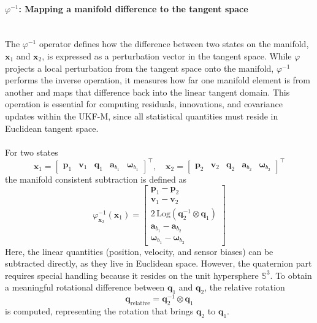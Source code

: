 \paragraph{$\varphi^{-1}$: Mapping a manifold difference to the tangent space} \mbox{}\\[0.5em] \noindent
The $\varphi^{-1}$ operator defines how the difference between two states on the manifold, $\mathbf{x}_1$ and $\mathbf{x}_2$, is expressed as a perturbation vector in the tangent space. While $\varphi$ projects a local perturbation from the tangent space onto the manifold, $\varphi^{-1}$ performs the inverse operation, it measures how far one manifold element is from another and maps that difference back into the linear tangent domain. This operation is essential for computing residuals, innovations, and covariance updates within the UKF-M, since all statistical quantities must reside in Euclidean tangent space.
\\ \\
For two states
$$
    \mathbf{x}_1 =
    \begin{bmatrix}
        \mathbf{p}_1 & \mathbf{v}_1 & \mathbf{q}_1 & \mathbf{a}_{b_1} & \mathbf{\omega}_{b_1}
    \end{bmatrix}^\top,
    \quad
    \mathbf{x}_2 =
    \begin{bmatrix}
        \mathbf{p}_2 & \mathbf{v}_2 & \mathbf{q}_2 & \mathbf{a}_{b_2} & \mathbf{\omega}_{b_2}
    \end{bmatrix}^\top
$$
the manifold consistent subtraction is defined as
$$
    \varphi^{-1}_{\mathbf{x}_2}(\mathbf{x}_1) =
    \begin{bmatrix}
        \mathbf{p}_1 - \mathbf{p}_2 \\
        \mathbf{v}_1 - \mathbf{v}_2 \\
        2\,\mathrm{Log}\!\left(\mathbf{q}_2^{-1} \otimes \mathbf{q}_1\right) \\
        \mathbf{a}_{b_1} - \mathbf{a}_{b_2} \\
        \mathbf{\omega}_{b_1} - \mathbf{\omega}_{b_2}
    \end{bmatrix}
$$
Here, the linear quantities (position, velocity, and sensor biases) can be subtracted directly, as they live in Euclidean space. However, the quaternion part requires special handling because it resides on the unit hypersphere $\mathbb{S}^3$. To obtain a meaningful rotational difference between $\mathbf{q}_1$ and $\mathbf{q}_2$, the relative rotation
$$
    \mathbf{q}_{\text{relative}} = \mathbf{q}_2^{-1} \otimes \mathbf{q}_1
$$
is computed, representing the rotation that brings $\mathbf{q}_2$ to $\mathbf{q}_1$.
